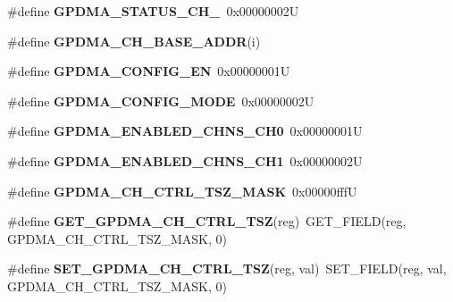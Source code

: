 \begin{DoxyCompactItemize}
\#define {\bfseries G\+P\+D\+M\+A\+\_\+\+S\+T\+A\+T\+U\+S\+\_\+\+C\+H\+\_}~0x00000002U
\item 
\#define {\bfseries G\+P\+D\+M\+A\+\_\+\+C\+H\+\_\+\+B\+A\+S\+E\+\_\+\+A\+D\+DR}(i)
\item 
\mbox{\label{group__lpc24xx__regs_ga0a960fa57ee803c44a6f793edca25703}} 
\#define {\bfseries G\+P\+D\+M\+A\+\_\+\+C\+O\+N\+F\+I\+G\+\_\+\+EN}~0x00000001U
\item 
\mbox{\label{group__lpc24xx__regs_gab5dc5fe2135ce526c629547f962132db}} 
\#define {\bfseries G\+P\+D\+M\+A\+\_\+\+C\+O\+N\+F\+I\+G\+\_\+\+M\+O\+DE}~0x00000002U
\item 
\mbox{\label{group__lpc24xx__regs_ga53124781d06031252eb75d15b0efcc8b}} 
\#define {\bfseries G\+P\+D\+M\+A\+\_\+\+E\+N\+A\+B\+L\+E\+D\+\_\+\+C\+H\+N\+S\+\_\+\+C\+H0}~0x00000001U
\item 
\mbox{\label{group__lpc24xx__regs_gac13bd0b98bf1804883751c57fd5ddc3d}} 
\#define {\bfseries G\+P\+D\+M\+A\+\_\+\+E\+N\+A\+B\+L\+E\+D\+\_\+\+C\+H\+N\+S\+\_\+\+C\+H1}~0x00000002U
\item 
\mbox{\label{group__lpc24xx__regs_ga166b9b07636eaa9cc4af26159b0bb173}} 
\#define {\bfseries G\+P\+D\+M\+A\+\_\+\+C\+H\+\_\+\+C\+T\+R\+L\+\_\+\+T\+S\+Z\+\_\+\+M\+A\+SK}~0x00000fffU
\item 
\mbox{\label{group__lpc24xx__regs_ga27077f9bf571ef8945c8da4c3806eeaa}} 
\#define {\bfseries G\+E\+T\+\_\+\+G\+P\+D\+M\+A\+\_\+\+C\+H\+\_\+\+C\+T\+R\+L\+\_\+\+T\+SZ}(reg)~G\+E\+T\+\_\+\+F\+I\+E\+LD(reg, G\+P\+D\+M\+A\+\_\+\+C\+H\+\_\+\+C\+T\+R\+L\+\_\+\+T\+S\+Z\+\_\+\+M\+A\+SK, 0)
\item 
\mbox{\label{group__lpc24xx__regs_ga4419d5f3d267f24deaa53b072ffbe4de}} 
\#define {\bfseries S\+E\+T\+\_\+\+G\+P\+D\+M\+A\+\_\+\+C\+H\+\_\+\+C\+T\+R\+L\+\_\+\+T\+SZ}(reg,  val)~S\+E\+T\+\_\+\+F\+I\+E\+LD(reg, val, G\+P\+D\+M\+A\+\_\+\+C\+H\+\_\+\+C\+T\+R\+L\+\_\+\+T\+S\+Z\+\_\+\+M\+A\+SK, 0)
\item 
\mbox{\label{group__lpc24xx__regs_gaa5fa3bdd1eab286d6dad388ede57a5d0}} 

\end{DoxyCompactItemize}
